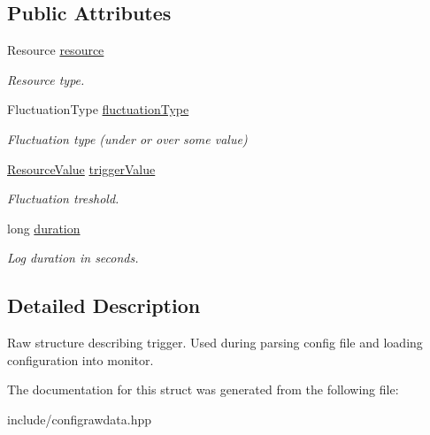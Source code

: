 \subsection*{Public Attributes}
\begin{DoxyCompactItemize}
\item 
Resource \hyperlink{structTriggerType_a1745935dd37baba0320cdac856a9aa6d}{resource}\hypertarget{structTriggerType_a1745935dd37baba0320cdac856a9aa6d}{}\label{structTriggerType_a1745935dd37baba0320cdac856a9aa6d}

\begin{DoxyCompactList}\small\item\em Resource type. \end{DoxyCompactList}\item 
Fluctuation\+Type \hyperlink{structTriggerType_adb6538c5cfef3d29f6ed1ada3817b6de}{fluctuation\+Type}\hypertarget{structTriggerType_adb6538c5cfef3d29f6ed1ada3817b6de}{}\label{structTriggerType_adb6538c5cfef3d29f6ed1ada3817b6de}

\begin{DoxyCompactList}\small\item\em Fluctuation type (under or over some value) \end{DoxyCompactList}\item 
\hyperlink{structResourceValue}{Resource\+Value} \hyperlink{structTriggerType_a1f77870d66ee02dd7125cf51532b2db3}{trigger\+Value}\hypertarget{structTriggerType_a1f77870d66ee02dd7125cf51532b2db3}{}\label{structTriggerType_a1f77870d66ee02dd7125cf51532b2db3}

\begin{DoxyCompactList}\small\item\em Fluctuation treshold. \end{DoxyCompactList}\item 
long \hyperlink{structTriggerType_ac5a050ba31cde59487b91e3ac16079ff}{duration}\hypertarget{structTriggerType_ac5a050ba31cde59487b91e3ac16079ff}{}\label{structTriggerType_ac5a050ba31cde59487b91e3ac16079ff}

\begin{DoxyCompactList}\small\item\em Log duration in seconds. \end{DoxyCompactList}\end{DoxyCompactItemize}


\subsection{Detailed Description}
Raw structure describing trigger. Used during parsing config file and loading configuration into monitor. 

The documentation for this struct was generated from the following file\+:\begin{DoxyCompactItemize}
\item 
include/configrawdata.\+hpp\end{DoxyCompactItemize}
